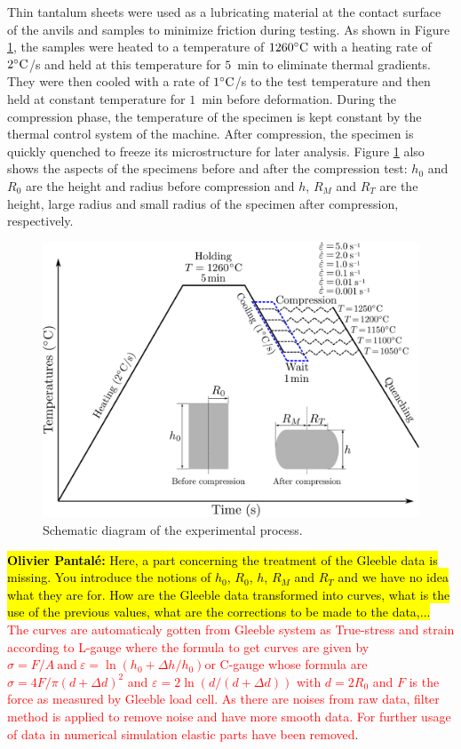 \documentclass[twoside,english,1p,final,sort&compress]{elsarticle}
\theoremstyle{plain}
\DeclareRobustCommand{\OP}[1]{ {\begingroup\sethlcolor{VWyellow}\textcolor{red}{\hl{\textbf{Olivier Pantal\'e:} #1}}\endgroup} }
\begin{document}
Thin tantalum sheets were used as a lubricating material at the contact surface of the anvils and samples to minimize friction during testing.
As shown in Figure \ref{fig:GleebleProcess}, the samples were heated to a temperature of $1260\celsius$ with a heating rate of $2\celsius$/s and held at this temperature for $5$~min to eliminate thermal gradients.
They were then cooled with a rate of $1\celsius$/s to the test temperature and then held at constant temperature for $1$~min before deformation.
During the compression phase, the temperature of the specimen is kept constant by the thermal control system of the machine.
After compression, the specimen is quickly quenched to freeze its microstructure for later analysis.
Figure \ref{fig:GleebleProcess} also shows the aspects of the specimens before and after the compression test: $h_0$ and $R_0$ are the height and radius before compression and $h$, $R_M$ and $R_T$ are the height, large radius and small radius of the specimen after compression, respectively.
\begin{figure}[!ht]
\centering
\includegraphics[width=0.8\columnwidth]{Figures/GleebleProcess}
\caption{Schematic diagram of the experimental process.}
\label{fig:GleebleProcess}
\end{figure}

\OP{Here, a part concerning the treatment of the Gleeble data is missing. You introduce the notions of $h_0$, $R_0$, $h$, $R_M$ and $R_T$ and we have no idea what they are for. How are the Gleeble data transformed into curves, what is the use of the previous values, what are the corrections to be made to the data,...}\textcolor{red}{The curves are automaticaly gotten from Gleeble system as True-stress and strain according to L-gauge where the formula to get curves are given by $\sigma =F/A\ \text{and}\ \varepsilon = \ln\left(h_0 +\Delta h / h_0\right) $or C-gauge whose formula are $\sigma = 4F/\pi(d+\Delta d)^2$ and $\varepsilon = 2\ln(d/(d+\Delta d))$ with $d = 2R_0$ and $F$ is the force as measured by Gleeble load cell. As there are noises from raw data, filter method is applied to remove noise and have more smooth data. For further usage of  data in numerical simulation elastic parts have been removed}.
\end{document}
